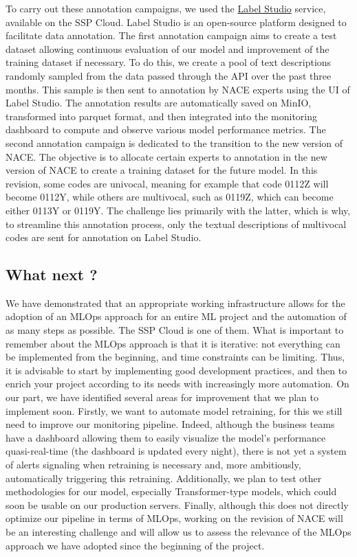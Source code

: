 To carry out these annotation campaigns, we used the \href{https://labelstud.io/}{Label Studio} service, available on the SSP Cloud. Label Studio is an open-source platform designed to facilitate data annotation. The first annotation campaign aims to create a test dataset allowing continuous evaluation of our model and improvement of the training dataset if necessary. To do this, we create a pool of text descriptions randomly sampled from the data passed through the API over the past three months. This sample is then sent to annotation by NACE experts using the UI of Label Studio. The annotation results are automatically saved on MinIO, transformed into parquet format, and then integrated into the monitoring dashboard to compute and observe various model performance metrics. The second annotation campaign is dedicated to the transition to the new version of NACE. The objective is to allocate certain experts to annotation in the new version of NACE to create a training dataset for the future model. In this revision, some codes are univocal, meaning for example that code 0112Z will become 0112Y, while others are multivocal, such as 0119Z, which can become either 0113Y or 0119Y. The challenge lies primarily with the latter, which is why, to streamline this annotation process, only the textual descriptions of multivocal codes are sent for annotation on Label Studio.


\subsection{What next ?}

We have demonstrated that an appropriate working infrastructure allows for the adoption of an MLOps approach for an entire ML project and the automation of as many steps as possible. The SSP Cloud is one of them. What is important to remember about the MLOps approach is that it is iterative: not everything can be implemented from the beginning, and time constraints can be limiting. Thus, it is advisable to start by implementing good development practices, and then to enrich your project according to its needs with increasingly more automation. On our part, we have identified several areas for improvement that we plan to implement soon. Firstly, we want to automate model retraining, for this we still need to improve our monitoring pipeline. Indeed, although the business teams have a dashboard allowing them to easily visualize the model's performance quasi-real-time (the dashboard is updated every night), there is not yet a system of alerts signaling when retraining is necessary and, more ambitiously, automatically triggering this retraining. Additionally, we plan to test other methodologies for our model, especially Transformer-type models, which could soon be usable on our production servers. Finally, although this does not directly optimize our pipeline in terms of MLOps, working on the revision of NACE will be an interesting challenge and will allow us to assess the relevance of the MLOps approach we have adopted since the beginning of the project.

